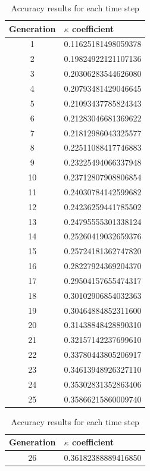\begin{table}[H]
\setlength{\tabcolsep}{15pt}
\renewcommand{\arraystretch}{1.8}
    \caption{Accuracy results for each time step}
    \begin{minipage}{.5\linewidth}
            \begin{tabular}{@{}cl@{}}
            \toprule
            Generation & $\kappa$ coefficient \\ \midrule
            1 &  0.11625181498059378 \\
2 &  0.19824922121107136 \\
3 &  0.20306283544626080 \\
4 &  0.20793481429046645 \\
5 &  0.21093437785824343 \\
6 &  0.21283046681369622 \\
7 &  0.21812986043325577 \\
8 &  0.22511088417746883 \\
9 &  0.23225494066337948 \\
10 & 0.23712807908806854 \\
11 & 0.24030784142599682 \\
12 & 0.24236259441785502 \\
13 & 0.24795555301338124 \\
14 & 0.25260419032659376 \\
15 & 0.25724181362747820 \\
16 & 0.28227924369204370 \\
17 & 0.29504157655474317 \\
18 & 0.30102906854032363 \\
19 & 0.30464884852311600 \\
20 & 0.31438848428890310 \\
21 & 0.32157142237699610 \\
22 & 0.33780443805206917 \\
23 & 0.34613948926327110 \\
24 & 0.35302831352863406 \\
25 & 0.35866215860009740 \\ \bottomrule
        \end{tabular}
    \end{minipage}%
    \begin{minipage}{.5\linewidth}
        \begin{tabular}{@{}cl@{}}
          \toprule
          Generation & $\kappa$ coefficient \\ \midrule
          26 & 0.36182388889416850 \\

\end{tabular}
\end{minipage}
\end{table}
